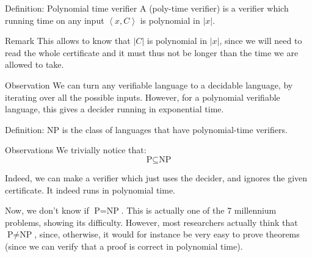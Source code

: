 \documentclass[a4paper]{article}
\begin{document}
\begin{parag}{Definition: Polynomial time verifier}
    A  (poly-time verifier) is a verifier which running time on any input $\left\langle x, C \right\rangle$ is polynomial in $\left|x\right|$.

    \begin{subparag}{Remark}
        This allows to know that $\left|C\right|$ is polynomial in $\left|x\right|$, since we will need to read the whole certificate and it must thus not be longer than the time we are allowed to take.
    \end{subparag}

    \begin{subparag}{Observation}
        We can turn any verifiable language to a decidable language, by iterating over all the possible inputs. However, for a polynomial verifiable language, this gives a decider running in exponential time.
    \end{subparag}
\end{parag}

\begin{parag}{Definition: NP}
     is the class of languages that have polynomial-time verifiers.
\end{parag}

\begin{parag}{Observations}
    We trivially notice that: 
    \[\text{P} \subseteq \text{NP}\]
    
    Indeed, we can make a verifier which just uses the decider, and ignores the given certificate. It indeed runs in polynomial time.

    Now, we don't know if $\text{P} = \text{NP}$. This is actually one of the 7 millennium problems, showing its difficulty. However, most researchers actually think that $\text{P} \neq \text{NP}$, since, otherwise, it would for instance be very easy to prove theorems (since we can verify that a proof is correct in polynomial time).
\end{parag}
\end{document}
